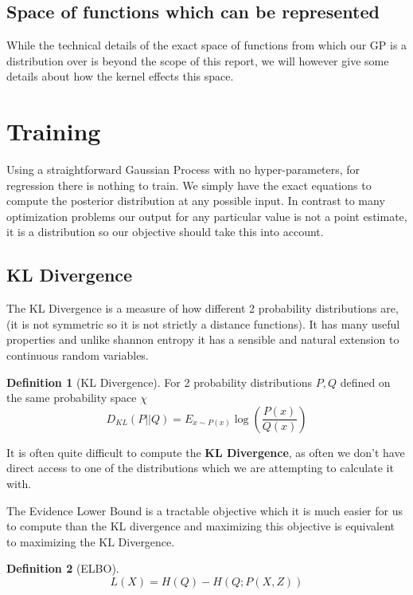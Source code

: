 \documentclass[12pt, a4paper]{report}
\theoremstyle{definition}
\theoremstyle{definition}
\newtheorem{definition}{Definition}[section]
\theoremstyle{definition}
\begin{document}
\subsection{Space of functions which can be represented}

While the technical details of the exact space of functions from which our GP is a distribution over is beyond the scope of this report, we will however give some details about how the kernel effects this space.




\section{Training}

Using a straightforward Gaussian Process with no hyper-parameters, for regression there is nothing to train. We simply have the exact equations to compute the posterior distribution at any possible input. In contrast to many optimization problems our output for any particular value is not a point estimate, it is a distribution so our objective should take this into account.


\subsection{KL Divergence}

The KL Divergence is a measure of how different 2 probability distributions are, (it is not symmetric so it is not strictly a distance functions). It has many useful properties and unlike shannon entropy it has a sensible and natural extension to continuous random variables.

\begin{definition}[KL Divergence]
    For 2 probability distributions $P, Q$ defined on the same probability space $\chi$
    $$D_{KL} \left( P || Q \right) = E_{x \sim P(x)}  \log \left( \frac{P(x)}{Q(x)}\right)$$
\end{definition}



It is often quite difficult to compute the \textbf{KL Divergence}, as often we don't have direct access to one of the distributions which we are attempting to calculate it with.

The Evidence Lower Bound is a tractable objective which it is much easier for us to compute than the KL divergence and maximizing this objective is equivalent to maximizing the KL Divergence.

\begin{definition}[ELBO]
    $$L \left( X \right) =  H(Q) - H \left(Q; P \left(X, Z\right) \right)$$
\end{definition} \cite{}
\end{document}
